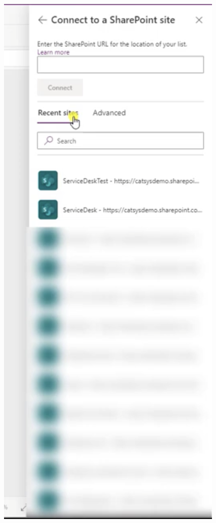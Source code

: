 \begin{figure}[H]
	\centering
	\includegraphics[scale = 0.3]{attachment/chapter_13/Scc055}
\end{figure}

